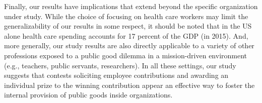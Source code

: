 \documentclass[11pt, titlepage]{article}
\begin{document}
Finally, our results have implications that extend beyond the specific
organization under study. While the choice of focusing on health care
workers may limit the generalizability of our results in some respect,
it should be noted that in the US alone health care spending accounts
for 17 percent of the GDP (in 2015). And, more generally, our study
results are also directly applicable to a variety of other professions
exposed to a public good dilemma in a mission-driven environment (e.g.,
teachers, public servants, researchers). In all these settings, our
study suggests that contests soliciting employee contributions and
awarding an individual prize to the winning contribution appear an
effective way to foster the internal provision of public goods inside
organizations.

\renewcommand\refname{References}

\end{document}
